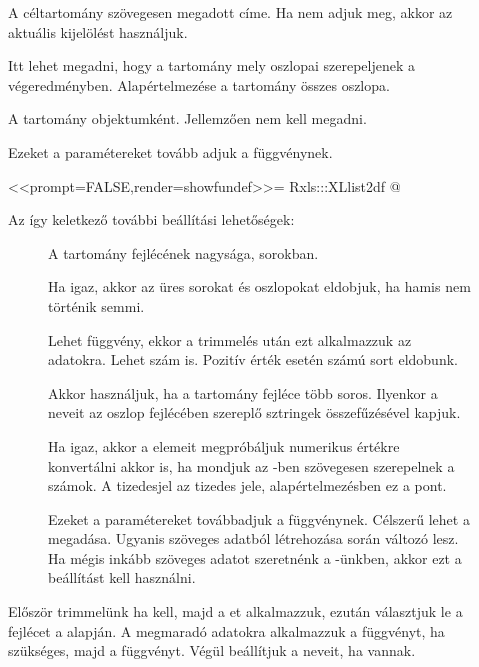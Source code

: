 \begin{description}
\item[] A céltartomány szövegesen megadott címe. Ha nem
  adjuk meg, akkor az aktuális kijelölést használjuk.
\item[] Itt lehet megadni, hogy a tartomány mely
  oszlopai szerepeljenek a végeredményben. Alapértelmezése a tartomány
  összes oszlopa. 
\item[] A tartomány  objektumként. Jellemzően nem kell megadni.
\item[] Ezeket a paramétereket tovább adjuk a
   függvénynek. 
  \begin{Rnw}

<<prompt=FALSE,render=showfundef>>=
Rxls:::XLlist2df
@
  \end{Rnw}
Az így keletkező további beállítási lehetőségek:
\begin{description}
\item[] A tartomány fejlécének nagysága, sorokban.
\item[] Ha igaz, akkor az üres sorokat és oszlopokat
  eldobjuk, ha hamis nem történik semmi.
\item[] Lehet függvény, ekkor a trimmelés után ezt
  alkalmazzuk az adatokra. Lehet szám is. Pozitív érték esetén 
  számú sort eldobunk. 
\item[] Akkor használjuk, ha a tartomány fejléce több
  soros. Ilyenkor a  
neveit az oszlop fejlécében szereplő sztringek összefűzésével kapjuk.
\item[] Ha igaz, akkor a  elemeit
  megpróbáljuk numerikus értékre konvertálni akkor is, ha mondjuk az
  -ben szövegesen szerepelnek a számok. A tizedesjel az
   tizedes jele, alapértelmezésben ez a pont. 
\item[] Ezeket a paramétereket továbbadjuk a 
  függvénynek. Célszerű lehet a  
  megadása. Ugyanis 
  szöveges adatból  létrehozása során 
  változó lesz. Ha mégis inkább szöveges adatot szeretnénk a
  -ünkben, 
  akkor ezt a beállítást kell használni.
\end{description}
Először trimmelünk ha kell, majd a et alkalmazzuk, ezután
választjuk le a fejlécet 
a  alapján. A megmaradó adatokra alkalmazzuk a
  függvényt, ha
szükséges, majd a  függvényt. Végül beállítjuk a
 neveit, ha vannak.


\end{description}
